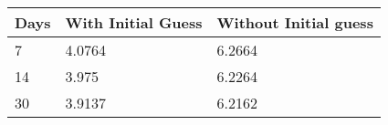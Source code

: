 \begin{tabular}{lll}
Days & With Initial Guess & Without Initial guess \\ 
\hline 
7 & 4.0764 & 6.2664 \\ 
14 & 3.975 & 6.2264 \\ 
30 & 3.9137 & 6.2162 \\ 
\hline 
\end{tabular}
